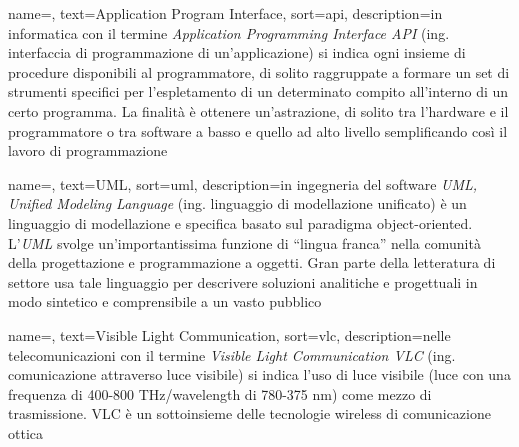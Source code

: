 





 {
    name=,
    text=Application Program Interface,
    sort=api,
    description={in informatica con il termine \emph{Application Programming Interface API} (ing. interfaccia di programmazione di un'applicazione) si indica ogni insieme di procedure disponibili al programmatore, di solito raggruppate a formare un set di strumenti specifici per l'espletamento di un determinato compito all'interno di un certo programma. La finalità è ottenere un'astrazione, di solito tra l'hardware e il programmatore o tra software a basso e quello ad alto livello semplificando così il lavoro di programmazione}
}

 {
    name=,
    text=UML,
    sort=uml,
    description={in ingegneria del software \emph{UML, Unified Modeling Language} (ing. linguaggio di modellazione unificato) è un linguaggio di modellazione e specifica basato sul paradigma object-oriented. L'\emph{UML} svolge un'importantissima funzione di ``lingua franca'' nella comunità della progettazione e programmazione a oggetti. Gran parte della letteratura di settore usa tale linguaggio per descrivere soluzioni analitiche e progettuali in modo sintetico e comprensibile a un vasto pubblico}
}

 {
    name=,
    text=Visible Light Communication,
    sort=vlc,
    description={nelle telecomunicazioni con il termine \emph{Visible Light Communication VLC} (ing. comunicazione attraverso luce visibile) si indica l'uso di luce visibile (luce con una frequenza di 400-800 THz/wavelength di 780-375 nm) come mezzo di trasmissione. VLC è un sottoinsieme delle tecnologie wireless di comunicazione ottica}
}

